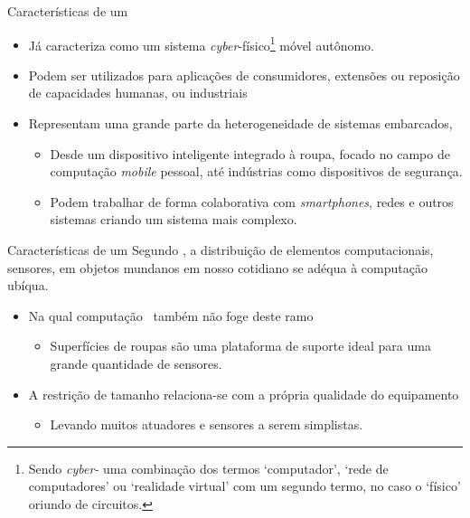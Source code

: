    \begin{frame}{Características de um \Wearable} \vspace{-1em}
      \begin{itemize}
         \setlength{\itemsep}{1.5em}
         \item Já \cite{Jozwiak2017} caracteriza como um sistema \textit{cyber}-físico\footnote{Sendo \textit{cyber-} uma combinação dos termos `computador', `rede de computadores' ou `realidade virtual' com um segundo termo, no caso o `físico' oriundo de circuitos.} móvel autônomo.
         
         \item Podem ser utilizados para aplicações de consumidores, extensões ou reposição de capacidades humanas, ou industriais
         
         \item Representam uma grande parte da heterogeneidade de sistemas embarcados, 
         \begin{itemize}
            \setlength{\itemsep}{1.0em}
            \item Desde um dispositivo inteligente integrado à roupa, focado no campo de computação \textit{mobile} pessoal, até indústrias como dispositivos de segurança. %
            \item Podem trabalhar de forma colaborativa com \textit{smartphones}, redes e outros sistemas criando um sistema mais complexo.
         \end{itemize}
      \end{itemize}
   \end{frame}


   \begin{frame}{Características de um \Wearable} \vspace{-1em}
      Segundo \cite{VanLaerhoven2002}, a distribuição de elementos computacionais, sensores, em objetos mundanos em nosso cotidiano se adéqua à computação ubíqua. 
      \begin{itemize}
         \setlength{\itemsep}{1.5em}
         \item Na qual computação \wearable\ também não foge deste ramo
         \begin{itemize}
            \item Superfícies de roupas são uma plataforma de suporte ideal para uma grande quantidade de sensores.
         \end{itemize}
         \item A restrição de tamanho relaciona-se com a própria qualidade do equipamento
         \begin{itemize}
            \item Levando muitos atuadores e sensores a serem simplistas.
         \end{itemize}
      \end{itemize}
   \end{frame}



